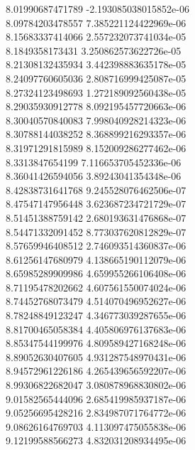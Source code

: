 {8.01990687471789 -2.193085038015852e-06 \\
8.09784203478557 7.385221124422969e-06 \\
8.15683337414066 2.557232073741034e-05 \\
8.1849358173431 3.250862573622726e-05 \\
8.21308132435934 3.442398883635178e-05 \\
8.24097760605036 2.808716999425087e-05 \\
8.27324123498693 1.272189092560438e-05 \\
8.29035930912778 8.092195457720663e-06 \\
8.30040570840083 7.998040928214323e-06 \\
8.30788144038252 8.368899216293357e-06 \\
8.31971291815989 8.152009286277462e-06 \\
8.3313847654199 7.116653705452336e-06 \\
8.36041426594056 3.89243041354348e-06 \\
8.42838731641768 9.245528076462506e-07 \\
8.47547147956448 3.623687234721729e-07 \\
8.51451388759142 2.680193631476868e-07 \\
8.54471332091452 8.773037620812829e-07 \\
8.57659946408512 2.746093514360837e-06 \\
8.61256147680979 4.138665190112079e-06 \\
8.65985289909986 4.659955266106408e-06 \\
8.71195478202662 4.607561550074024e-06 \\
8.74452768073479 4.514070496952627e-06 \\
8.78248849123247 4.346773039287655e-06 \\
8.81700465058384 4.405806976137683e-06 \\
8.85347544199976 4.809589427168248e-06 \\
8.89052630407605 4.931287548970431e-06 \\
8.94572961226186 4.265439656592207e-06 \\
8.99306822682047 3.080878968830802e-06 \\
9.01582565444096 2.685419985937187e-06 \\
9.05256695428216 2.834987071764772e-06 \\
9.08626164769703 4.113097475055838e-06 \\
9.12199588566273 4.832031208934495e-06 \\
}
